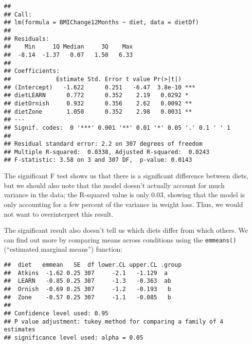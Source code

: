 \documentclass[]{book}
\newenvironment{Shaded}{\begin{snugshade}}{\end{snugshade}}
\newcommand{\KeywordTok}[1]{\textcolor[rgb]{0.13,0.29,0.53}{\textbf{#1}}}
\newcommand{\DataTypeTok}[1]{\textcolor[rgb]{0.13,0.29,0.53}{#1}}
\newcommand{\DecValTok}[1]{\textcolor[rgb]{0.00,0.00,0.81}{#1}}
\newcommand{\StringTok}[1]{\textcolor[rgb]{0.31,0.60,0.02}{#1}}
\newcommand{\CommentTok}[1]{\textcolor[rgb]{0.56,0.35,0.01}{\textit{#1}}}
\newcommand{\OperatorTok}[1]{\textcolor[rgb]{0.81,0.36,0.00}{\textbf{#1}}}
\newcommand{\NormalTok}[1]{#1}
\theoremstyle{definition}
\theoremstyle{definition}
\theoremstyle{definition}
\theoremstyle{remark}
\begin{document}
\begin{verbatim}
## 
## Call:
## lm(formula = BMIChange12Months ~ diet, data = dietDf)
## 
## Residuals:
##    Min     1Q Median     3Q    Max 
##  -8.14  -1.37   0.07   1.50   6.33 
## 
## Coefficients:
##             Estimate Std. Error t value Pr(>|t|)    
## (Intercept)   -1.622      0.251   -6.47  3.8e-10 ***
## dietLEARN      0.772      0.352    2.19   0.0292 *  
## dietOrnish     0.932      0.356    2.62   0.0092 ** 
## dietZone       1.050      0.352    2.98   0.0031 ** 
## ---
## Signif. codes:  0 '***' 0.001 '**' 0.01 '*' 0.05 '.' 0.1 ' ' 1
## 
## Residual standard error: 2.2 on 307 degrees of freedom
## Multiple R-squared:  0.0338, Adjusted R-squared:  0.0243 
## F-statistic: 3.58 on 3 and 307 DF,  p-value: 0.0143
\end{verbatim}

The significant F test shows us that there is a significant difference
between diets, but we should also note that the model doesn't actually
account for much variance in the data; the R-squared value is only 0.03,
showing that the model is only accounting for a few percent of the
variance in weight loss. Thus, we would not want to overinterpret this
result.

The significant result also doesn't tell us which diets differ from
which others. We can find out more by comparing means across conditions
using the \texttt{emmeans()} (``estimated marginal means'') function:

\begin{Shaded}
\end{Shaded}

\begin{verbatim}
##  diet   emmean   SE  df lower.CL upper.CL .group
##  Atkins  -1.62 0.25 307     -2.1   -1.129  a    
##  LEARN   -0.85 0.25 307     -1.3   -0.363  ab   
##  Ornish  -0.69 0.25 307     -1.2   -0.193   b   
##  Zone    -0.57 0.25 307     -1.1   -0.085   b   
## 
## Confidence level used: 0.95 
## P value adjustment: tukey method for comparing a family of 4 estimates 
## significance level used: alpha = 0.05
\end{verbatim}
\end{document}
